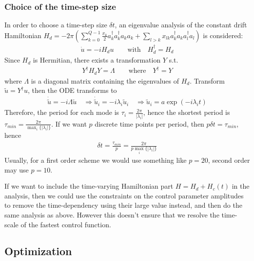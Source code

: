 \documentclass[11pt]{article}
\begin{document}
    \subsubsection{Choice of the time-step size}
    In order to choose a time-step size $\delta t$, an eigenvalue analysis of
    the constant drift Hamiltonian $H_d =  -2\pi \left(\sum_{k=0}^{Q-1} \frac{x_k}{2}
    a_k^{\dagger}a_k^{\dagger}a_ka_k + \sum_{l>k} x_{lk}
    a_{k}^{\dagger}a_{k}
    a_{l}^{\dagger}a_{l}\right)$ is considered:
       \begin{align*}  
         \dot u = -i H_d u \qquad \text{with} \quad H_d^{\dagger}  = H_d
       \end{align*} 
       Since $H_d$ is Hermitian, there exists a transformation $Y$ s.t. 
       \begin{align*}
         Y^{\dagger}H_d Y = \Lambda \qquad  \text{where} \quad Y^{\dagger} = Y
       \end{align*}
       where $\Lambda$ is a diagonal matrix containing the eigenvalues of $H_d$.
       Transform $\tilde u = Y^{\dagger} u$, then the ODE transforms to 
       \begin{align*}
         \dot \tilde u = -i \Lambda \tilde u \quad \Rightarrow \dot \tilde u_i =
         -i\lambda_i \tilde u_i \quad \Rightarrow \tilde u_i = a
         \exp(-i\lambda_i t)
       \end{align*}
       Therefore, the period for each mode is $\tau_i =
       \frac{2\pi}{|\lambda_i|}$, hence the shortest period is $\tau_{min} =
       \frac{2\pi}{\max_i\{|\lambda_i|\}}$. If we want $p$ discrete time points
       per period, then $p\delta t = \tau_{min}$, hence 
       \begin{align*}
         \delta t = \frac{\tau_{min}}{p} = \frac{2\pi}{p\max_i\{|\lambda_i|\}}
       \end{align*}
       Usually, for a first order scheme we would use something like $p=20$,
       second order may use $p=10$. 

       If we want to include the time-varying Hamiltonian part $H = H_d +
       H_c(t)$ in the analysis, then we could use the constraints on the control
       parameter amplitudes to remove the time-dependency using their large
       value instead, and then do the same analysis as above. However this
       doesn't ensure that we resolve the time-scale of the fastest control
       function. 
      
\subsection{Optimization}
\end{document}
